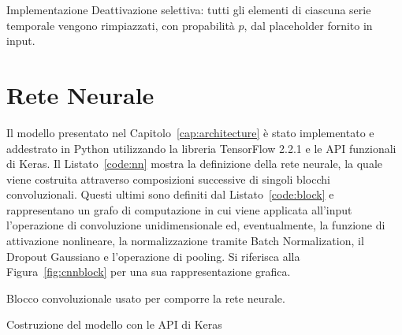 \begin{listing}[H]
  \caption{Implementazione Deattivazione selettiva: tutti gli elementi di
    ciascuna serie temporale vengono rimpiazzati, con propabilità \(p\), dal
    placeholder fornito in input.}
\end{listing}

\section{Rete Neurale}
Il modello presentato nel Capitolo~\ref{cap:architecture} è stato implementato
e addestrato in Python utilizzando la libreria TensorFlow 2.2.1 e le API
funzionali di Keras. Il Listato~\ref{code:nn} mostra la definizione della rete
neurale, la quale viene costruita attraverso composizioni successive di singoli
blocchi convoluzionali. 
Questi ultimi sono definiti dal
Listato~\ref{code:block} e rappresentano un grafo di computazione in cui viene
applicata all'input l'operazione di convoluzione unidimensionale ed,
eventualmente, la funzione di attivazione nonlineare, la normalizzazione
tramite Batch Normalization, il Dropout Gaussiano e l'operazione di pooling. Si
riferisca alla Figura~\ref{fig:cnnblock} per una sua rappresentazione grafica.
\begin{listing}[htp]
	\caption{Blocco convoluzionale usato per comporre la rete neurale.}
  \label{code:block}
\end{listing}
\begin{listing}[htp]
  \caption{Costruzione del modello con le API di Keras}
  \label{code:nn}
\end{listing}




